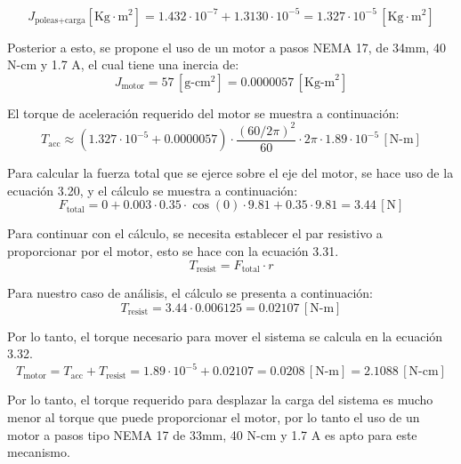\documentclass[14pt,oneside]{extarticle} %
\begin{document}
\[
J_{\text{poleas+carga}} [\text{Kg} \cdot \text{m}^2] = 1.432 \cdot 10^{-7} + 1.3130 \cdot 10^{-5} = 1.327 \cdot 10^{-5} \, [\text{Kg} \cdot \text{m}^2]
\]

Posterior a esto, se propone el uso de un motor a pasos NEMA 17, de 34mm, 40 N-cm y 1.7 A, el cual tiene una inercia de:
\begin{equation}
J_{\text{motor}} = 57 \, [\text{g-cm}^2] = 0.0000057 \, [\text{Kg-m}^2]
\label{eq:J_motor}
\end{equation}

El torque de aceleración requerido del motor se muestra a continuación:
\begin{equation}
T_{\text{acc}} \approx \left(1.327 \cdot 10^{-5} + 0.0000057\right) \cdot \frac{(60/2\pi)^2}{60} \cdot 2\pi \cdot 1.89 \cdot 10^{-5} \, [\text{N-m}]
\label{eq:torque_acc}
\end{equation}

Para calcular la fuerza total que se ejerce sobre el eje del motor, se hace uso de la ecuación 3.20, y el cálculo se muestra a continuación:
\begin{equation}
F_{\text{total}} = 0 + 0.003 \cdot 0.35 \cdot \cos(0) \cdot 9.81 + 0.35 \cdot 9.81 = 3.44 \, [\text{N}]
\label{eq:force_total}
\end{equation}

Para continuar con el cálculo, se necesita establecer el par resistivo a proporcionar por el motor, esto se hace con la ecuación 3.31.
\begin{equation}
T_{\text{resist}} = F_{\text{total}} \cdot r
\label{eq:torque_resist}
\end{equation}

Para nuestro caso de análisis, el cálculo se presenta a continuación:
\begin{equation}
T_{\text{resist}} = 3.44 \cdot 0.006125 = 0.02107 \, [\text{N-m}]
\label{eq:calc_torque_resist}
\end{equation}

Por lo tanto, el torque necesario para mover el sistema se calcula en la ecuación 3.32.
\begin{equation}
T_{\text{motor}} = T_{\text{acc}} + T_{\text{resist}} = 1.89 \cdot 10^{-5} + 0.02107 = 0.0208 \, [\text{N-m}] = 2.1088 \, [\text{N-cm}]
\label{eq:total_motor_torque}
\end{equation}

Por lo tanto, el torque requerido para desplazar la carga del sistema es mucho menor
al torque que puede proporcionar el motor, por lo tanto el uso de un motor a pasos
tipo NEMA 17 de 33mm, 40 N-cm y 1.7 A es apto para este mecanismo.
\end{document}
